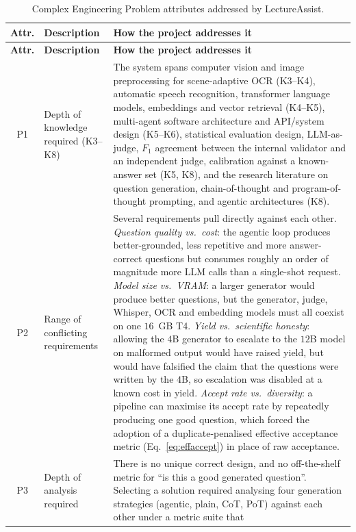 {\footnotesize\singlespacing
\begin{longtable}{|c|p{3.4cm}|p{8.4cm}|}
\caption{Complex Engineering Problem attributes addressed by LectureAssist.}
\label{tab:cep}\\
\hline
\textbf{Attr.} & \textbf{Description} & \textbf{How the project addresses it} \\
\hline
\endfirsthead
\hline
\textbf{Attr.} & \textbf{Description} & \textbf{How the project addresses it} \\
\hline
\endhead
\hline
\endfoot
\hline
\endlastfoot

P1 & Depth of knowledge required (K3--K8) &
The system spans computer vision and image preprocessing for scene-adaptive OCR
(K3--K4), automatic speech recognition, transformer language models, embeddings and
vector retrieval (K4--K5), multi-agent software architecture and API/system design
(K5--K6), statistical evaluation design, LLM-as-judge, $F_1$ agreement between the
internal validator and an independent judge, calibration against a known-answer set
(K5, K8), and the research literature on question generation, chain-of-thought and
program-of-thought prompting, and agentic architectures (K8). \\
\hline
P2 & Range of conflicting requirements &
Several requirements pull directly against each other. \emph{Question quality vs.\
cost}: the agentic loop produces better-grounded, less repetitive and more
answer-correct questions but consumes roughly an order of magnitude more LLM calls
than a single-shot request. \emph{Model size vs.\ VRAM}: a larger generator would
produce better questions, but the generator, judge, Whisper, OCR and embedding models
must all coexist on one $16$\, GB T4. \emph{Yield vs.\ scientific honesty}: allowing
the $4$B generator to escalate to the $12$B model on malformed output would have
raised yield, but would have falsified the claim that the questions were written by
the $4$B, so escalation was disabled at a known cost in yield. \emph{Accept rate
vs.\ diversity}: a pipeline can maximise its accept rate by repeatedly producing one
good question, which forced the adoption of a duplicate-penalised effective
acceptance metric (Eq.~\ref{eq:effaccept}) in place of raw acceptance. \\
\hline
P3 & Depth of analysis required &
There is no unique correct design, and no off-the-shelf metric for ``is this a good
generated question''. Selecting a solution required analysing four generation
strategies (agentic, plain, CoT, PoT) against each other under a metric suite that

\end{longtable}}
